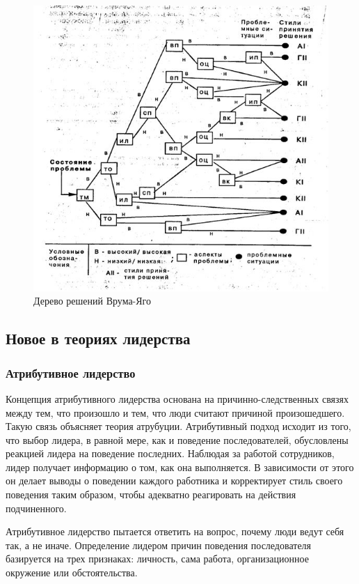 \documentclass[a4paper,12pt,oneside,final]{extarticle}
\makeatletter
\numberwithin{equation}{section}
\def\maxwidth#1{\ifdim\Gin@nat@width>#1 #1\else\Gin@nat@width\fi}
\makeatother
\begin{document}
\begin{enumerate}
\begin{figure}[h]
	\centering
	\includegraphics[width=\maxwidth{\textwidth}]{management-figures/leadership_vyy_2}
	\caption{Дерево решений Врума-Яго}
	\label{leadership_vyy_2}
\end{figure}

\subsection{Новое в теориях лидерства}
\subsubsection{Атрибутивное лидерство}
Концепция атрибутивного лидерства основана на причинно-следственных связях между тем, что произошло и тем, что люди считают причиной произошедшего. 
Такую связь объясняет теория атрубуции. 
Атрибутивный подход исходит из того, что выбор лидера, в равной мере, как и поведение последователей, обусловлены реакцией лидера на поведение последних.
Наблюдая за работой сотрудников, лидер получает информацию о том, как она выполняется. 
В зависимости от этого он делает выводы о поведении каждого работника и корректирует стиль своего поведения таким образом, чтобы адекватно реагировать на действия подчиненного. 

Атрибутивное лидерство пытается ответить на вопрос, почему люди ведут себя так, а не иначе. 
Определение лидером причин поведения последователя базируется на трех признаках: личность, сама работа, организационное окружение или обстоятельства.


\end{enumerate}
\end{document}
